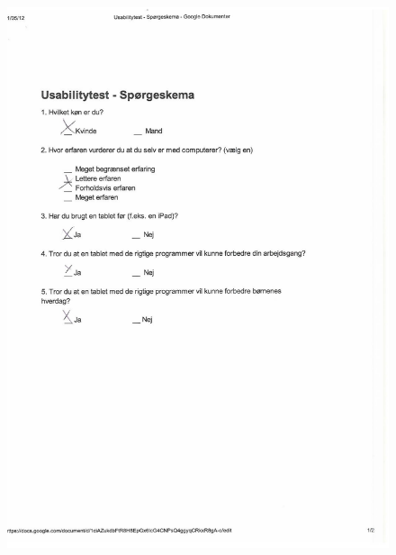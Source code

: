 \begin{figure}
	\centering
		\includegraphics{input/appendices/demo_m1.pdf}
	\label{fig:demo_t}
\end{figure}

